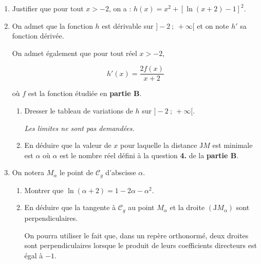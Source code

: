 \begin{enumerate}
\item Justifier que pour tout $x>-2$, on a : \quad $h(x)=x^{2}+[\ln (x+2)-1]^{2}$.

\item On admet que la fonction $h$ est dérivable sur $]-2 ~;~ +\infty[$ et on note $h'$ sa fonction dérivée.

On admet également que pour tout réel $x>-2$,

$$h'(x)=\dfrac{2 f(x)}{x+2}$$

où $f$ est la fonction étudiée en \textbf{partie B}.

\begin{enumerate}
	\item Dresser le tableau de variations de $h$ sur $]-2 ~;~ +\infty[$.

	\emph{Les limites ne sont pas demandées.}

	\item En déduire que la valeur de $x$ pour laquelle la distance $\mathrm{J}M$ est minimale est $\alpha$ où $\alpha$ est le nombre réel défini à la question \textbf{4.} de la \textbf{partie B}.
\end{enumerate}

\item On notera $M_{\alpha}$ le point de $\mathcal{C}_{g}$ d'abscisse $\alpha$.

	\begin{enumerate}
		\item Montrer que \quad $\ln (\alpha+2)=1-2 \alpha-\alpha^{2}$.

		\item En déduire que la tangente à $\mathcal{C}_{g}$ au point $M_{\alpha}$ et la droite $\left(\mathrm{J}M_{\alpha}\right)$ sont perpendiculaires.

On pourra utiliser le fait que, dans un repère orthonormé, deux droites sont perpendiculaires lorsque le produit de leurs coefficients directeurs est égal à $-1$.
	\end{enumerate}
\end{enumerate}

\bigskip
